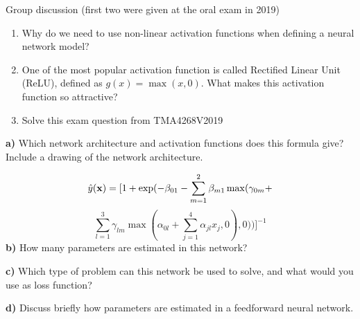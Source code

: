 \documentclass[
  ignorenonframetext,
]{beamer}
\begin{document}
\begin{frame}
\begin{block}{Group discussion}
\protect\hypertarget{group-discussion}{}
(first two were given at the oral exam in 2019)

\begin{enumerate}
\item
  Why do we need to use non-linear activation functions when defining a
  neural network model?
\item
  One of the most popular activation function is called Rectified Linear
  Unit (ReLU), defined as \(g(x) = \max(x,0)\). What makes this
  activation function so attractive?
\item
  Solve this exam question from TMA4268V2019
\end{enumerate}

\textbf{a)} Which network architecture and activation functions does
this formula give? Include a drawing of the network architecture.

\[ \hat{y}({\bf x})=[1+\exp(-\beta_{01}-\sum_{m=1}^2 \beta_{m1}\max(\gamma_{0m}+\]
\[\sum_{l=1}^{3} \gamma_{lm}\max(\alpha_{0l}+\sum_{j=1}^{4}\alpha_{jl}x_j,0),0))]^{-1}\]
\textbf{b)} How many parameters are estimated in this network?

\textbf{c)} Which type of problem can this network be used to solve, and
what would you use as loss function?

\textbf{d)} Discuss briefly how parameters are estimated in a
feedforward neural network.
\end{block}
\end{frame}
\end{document}
